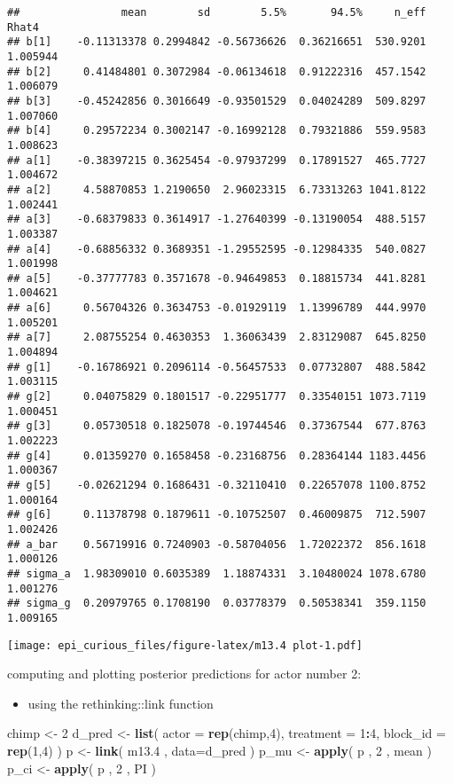 \documentclass[
]{article}
\newenvironment{Shaded}{\begin{snugshade}}{\end{snugshade}}
\newcommand{\DataTypeTok}[1]{\textcolor[rgb]{0.13,0.29,0.53}{#1}}
\newcommand{\DecValTok}[1]{\textcolor[rgb]{0.00,0.00,0.81}{#1}}
\newcommand{\FloatTok}[1]{\textcolor[rgb]{0.00,0.00,0.81}{#1}}
\newcommand{\KeywordTok}[1]{\textcolor[rgb]{0.13,0.29,0.53}{\textbf{#1}}}
\newcommand{\NormalTok}[1]{#1}
\newcommand{\OperatorTok}[1]{\textcolor[rgb]{0.81,0.36,0.00}{\textbf{#1}}}
\newcommand{\StringTok}[1]{\textcolor[rgb]{0.31,0.60,0.02}{#1}}
\providecommand{\tightlist}{%
  \setlength{\itemsep}{0pt}\setlength{\parskip}{0pt}}
\begin{document}
\begin{verbatim}
##                mean        sd        5.5%       94.5%     n_eff    Rhat4
## b[1]    -0.11313378 0.2994842 -0.56736626  0.36216651  530.9201 1.005944
## b[2]     0.41484801 0.3072984 -0.06134618  0.91222316  457.1542 1.006079
## b[3]    -0.45242856 0.3016649 -0.93501529  0.04024289  509.8297 1.007060
## b[4]     0.29572234 0.3002147 -0.16992128  0.79321886  559.9583 1.008623
## a[1]    -0.38397215 0.3625454 -0.97937299  0.17891527  465.7727 1.004672
## a[2]     4.58870853 1.2190650  2.96023315  6.73313263 1041.8122 1.002441
## a[3]    -0.68379833 0.3614917 -1.27640399 -0.13190054  488.5157 1.003387
## a[4]    -0.68856332 0.3689351 -1.29552595 -0.12984335  540.0827 1.001998
## a[5]    -0.37777783 0.3571678 -0.94649853  0.18815734  441.8281 1.004621
## a[6]     0.56704326 0.3634753 -0.01929119  1.13996789  444.9970 1.005201
## a[7]     2.08755254 0.4630353  1.36063439  2.83129087  645.8250 1.004894
## g[1]    -0.16786921 0.2096114 -0.56457533  0.07732807  488.5842 1.003115
## g[2]     0.04075829 0.1801517 -0.22951777  0.33540151 1073.7119 1.000451
## g[3]     0.05730518 0.1825078 -0.19744546  0.37367544  677.8763 1.002223
## g[4]     0.01359270 0.1658458 -0.23168756  0.28364144 1183.4456 1.000367
## g[5]    -0.02621294 0.1686431 -0.32110410  0.22657078 1100.8752 1.000164
## g[6]     0.11378798 0.1879611 -0.10752507  0.46009875  712.5907 1.002426
## a_bar    0.56719916 0.7240903 -0.58704056  1.72022372  856.1618 1.000126
## sigma_a  1.98309010 0.6035389  1.18874331  3.10480024 1078.6780 1.001276
## sigma_g  0.20979765 0.1708190  0.03778379  0.50538341  359.1150 1.009165
\end{verbatim}

\texttt{[image: epi\_curious\_files/figure-latex/m13.4 plot-1.pdf]}

computing and plotting posterior predictions for actor number 2:

\begin{itemize}
\tightlist
\item
  using the rethinking::link function
\end{itemize}

\begin{Shaded}
\begin{Highlighting}[]
\NormalTok{chimp <-}\StringTok{ }\DecValTok{2} 
\NormalTok{d_pred <-}\StringTok{ }\KeywordTok{list}\NormalTok{(}
\DataTypeTok{actor =} \KeywordTok{rep}\NormalTok{(chimp,}\DecValTok{4}\NormalTok{), }\DataTypeTok{treatment =} \DecValTok{1}\OperatorTok{:}\DecValTok{4}\NormalTok{, }\DataTypeTok{block_id =} \KeywordTok{rep}\NormalTok{(}\DecValTok{1}\NormalTok{,}\DecValTok{4}\NormalTok{)}
\NormalTok{)}
\NormalTok{p <-}\StringTok{ }\KeywordTok{link}\NormalTok{( m13}\FloatTok{.4}\NormalTok{ , }\DataTypeTok{data=}\NormalTok{d_pred ) }
\NormalTok{p_mu <-}\StringTok{ }\KeywordTok{apply}\NormalTok{( p , }\DecValTok{2}\NormalTok{ , mean ) }
\NormalTok{p_ci <-}\StringTok{ }\KeywordTok{apply}\NormalTok{( p , }\DecValTok{2}\NormalTok{ , PI )}
\end{Highlighting}
\end{Shaded}
\end{document}

